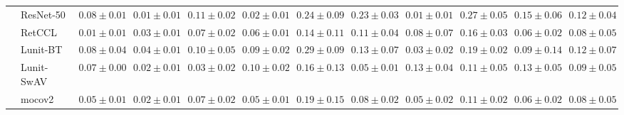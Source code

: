 \begin{tabular}{ll|cccc|c|cccc|c}
 & ResNet-50 & $0.08 \pm 0.01$ & $\mathbf{0.01 \pm 0.01}$ & $0.11 \pm 0.02$ & $0.02 \pm 0.01$ & $0.24 \pm 0.09$ & $0.23 \pm 0.03$ & $\mathbf{0.01 \pm 0.01}$ & $0.27 \pm 0.05$ & $0.15 \pm 0.06$ & $0.12 \pm 0.04$ \\
 & RetCCL & $0.01 \pm 0.01$ & $0.03 \pm 0.01$ & $0.07 \pm 0.02$ & $0.06 \pm 0.01$ & $0.14 \pm 0.11$ & $0.11 \pm 0.04$ & $0.08 \pm 0.07$ & $0.16 \pm 0.03$ & $0.06 \pm 0.02$ & $0.08 \pm 0.05$ \\
 & Lunit-BT & $0.08 \pm 0.04$ & $0.04 \pm 0.01$ & $0.10 \pm 0.05$ & $0.09 \pm 0.02$ & $0.29 \pm 0.09$ & $0.13 \pm 0.07$ & $0.03 \pm 0.02$ & $0.19 \pm 0.02$ & $0.09 \pm 0.14$ & $0.12 \pm 0.07$ \\
 & Lunit-SwAV & $0.07 \pm 0.00$ & $0.02 \pm 0.01$ & $0.03 \pm 0.02$ & $0.10 \pm 0.02$ & $0.16 \pm 0.13$ & $0.05 \pm 0.01$ & $0.13 \pm 0.04$ & $0.11 \pm 0.05$ & $0.13 \pm 0.05$ & $0.09 \pm 0.05$ \\
 & mocov2 & $0.05 \pm 0.01$ & $0.02 \pm 0.01$ & $0.07 \pm 0.02$ & $0.05 \pm 0.01$ & $0.19 \pm 0.15$ & $0.08 \pm 0.02$ & $0.05 \pm 0.02$ & $0.11 \pm 0.02$ & $0.06 \pm 0.02$ & $0.08 \pm 0.05$ \\
\cline{1-12}
\bottomrule
\end{tabular}
